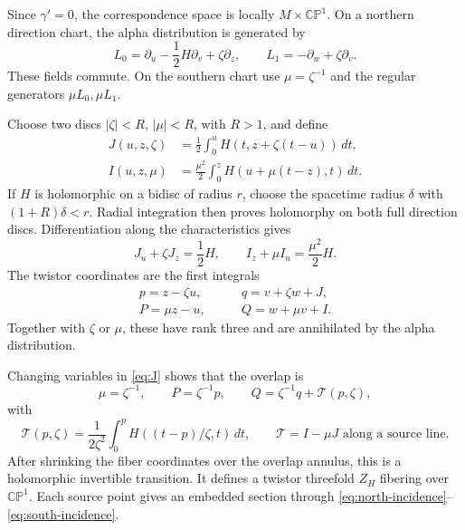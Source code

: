 \documentclass[11pt]{article}
\numberwithin{equation}{section}
\theoremstyle{definition}
\theoremstyle{remark}
\newcommand{\CP}{\mathbb{CP}}
\newcommand{\calT}{\mathcal T}
\begin{document}
Since $\gamma'=0$, the correspondence space is locally $M\times\CP^1$. On a northern direction chart, the alpha distribution is generated by
\begin{equation}\label{eq:source-alpha}
L_0=\partial_u-\frac12H\partial_v+\zeta\partial_z,
\qquad L_1=-\partial_w+\zeta\partial_v.
\end{equation}
These fields commute. On the southern chart use $\mu=\zeta^{-1}$ and the regular generators $\mu L_0,\mu L_1$.

Choose two discs $|\zeta|<R$, $|\mu|<R$, with $R>1$, and define
\begin{align}
J(u,z,\zeta)&=\frac12\int_0^u H(t,z+\zeta(t-u))\,dt,
\label{eq:J}\\
I(u,z,\mu)&=\frac{\mu^2}{2}\int_0^z H(u+\mu(t-z),t)\,dt.
\label{eq:I}
\end{align}
If $H$ is holomorphic on a bidisc of radius $r$, choose the spacetime radius $\delta$ with $(1+R)\delta<r$. Radial integration then proves holomorphy on both full direction discs. Differentiation along the characteristics gives
\begin{equation}\label{eq:transport-integrals}
J_u+\zeta J_z=\frac12H,
\qquad I_z+\mu I_u=\frac{\mu^2}{2}H.
\end{equation}
The twistor coordinates are the first integrals
\begin{align}
p=z-\zeta u,&\qquad q=v+\zeta w+J,
\label{eq:north-incidence}\\
P=\mu z-u,&\qquad Q=w+\mu v+I.
\label{eq:south-incidence}
\end{align}
Together with $\zeta$ or $\mu$, these have rank three and are annihilated by the alpha distribution.

Changing variables in \eqref{eq:J} shows that the overlap is
\begin{equation}\label{eq:twistor-transition}
\mu=\zeta^{-1},\qquad P=\zeta^{-1}p,
\qquad Q=\zeta^{-1}q+\calT(p,\zeta),
\end{equation}
with
\begin{equation}\label{eq:shear-integral}
\calT(p,\zeta)=\frac1{2\zeta^2}\int_0^p H((t-p)/\zeta,t)\,dt,
\qquad \calT=I-\mu J\text{ along a source line}.
\end{equation}
After shrinking the fiber coordinates over the overlap annulus, this is a holomorphic invertible transition. It defines a twistor threefold $Z_H$ fibering over $\CP^1$. Each source point gives an embedded section through \eqref{eq:north-incidence}--\eqref{eq:south-incidence}.
\end{document}
